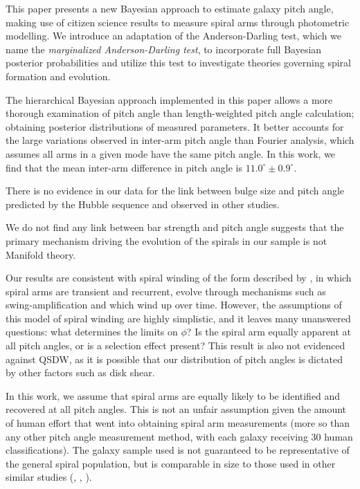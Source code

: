 This paper presents a new Bayesian approach to estimate galaxy pitch angle, making use of citizen science results to measure spiral arms through photometric modelling. We introduce an adaptation of the Anderson-Darling test, which we name the \textit{marginalized Anderson-Darling test}, to incorporate full Bayesian posterior probabilities and utilize this test to investigate theories governing spiral formation and evolution.

The hierarchical Bayesian approach implemented in this paper allows a more thorough examination of pitch angle than length-weighted pitch angle calculation; obtaining posterior distributions of measured parameters. It better accounts for the large variations observed in inter-arm pitch angle than Fourier analysis, which assumes all arms in a given mode have the same pitch angle. In this work, we find that the mean inter-arm difference in pitch angle is $11.0^\circ\pm 0.9^\circ$.

There is no evidence in our data for the link between bulge size and pitch angle predicted by the Hubble sequence and observed in other studies.

We do not find any link between bar strength and pitch angle suggests that the primary mechanism driving the evolution of the spirals in our sample is not Manifold theory.

Our results are consistent with spiral winding of the form described by \citet{2019arXiv190910291P}, in which spiral arms are transient and recurrent, evolve through mechanisms such as swing-amplification \citep{1965MNRAS.130..125G} and which wind up over time. However, the assumptions of this model of spiral winding are highly simplistic, and it leaves many unanswered questions: what determines the limits on $\phi$? Is the spiral arm equally apparent at all pitch angles, or is a selection effect present? This result is also not evidenced against QSDW, as it is possible that our distribution of pitch angles is dictated by other factors such as disk shear.

In this work, we assume that spiral arms are equally likely to be identified and recovered at all pitch angles. This is not an unfair assumption given the amount of human effort that went into obtaining spiral arm measurements (more so than any other pitch angle measurement method, with each galaxy receiving 30 human classifications). The galaxy sample used is not guaranteed to be representative of the general spiral population, but is comparable in size to those used in other similar studies (\citealt{2013MNRAS.436.1074S}, \citealt{2019ApJ...871..194Y}, \citealt{2019arXiv190910291P}).


